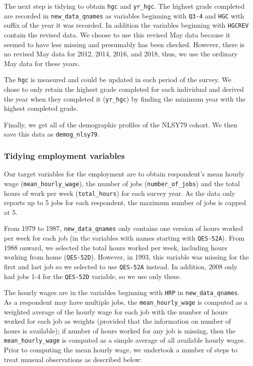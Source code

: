 \documentclass{article}
\begin{document}
The next step is tidying to obtain \texttt{hgc} and \texttt{yr\_hgc}. The highest grade completed are recorded in \texttt{new\_data\_qnames} as variables beginning with \texttt{Q3-4} and \texttt{HGC} with suffix of the year it was recorded. In addition the variables beginning with \texttt{HGCREV} contain the revised data. We choose to use this revised May data because it seemed to have less missing and presumably has been checked. However, there is no revised May data for 2012, 2014, 2016, and 2018, thus, we use the ordinary May data for these years.

The \texttt{hgc} is measured and could be updated in each period of the survey. We chose to only retain the highest grade completed for each individual and derived the year when they completed it (\texttt{yr\_hgc}) by finding the minimum year with the highest completed grade.

Finally, we get all of the demographic profiles of the NLSY79 cohort. We then save this data as \texttt{demog\_nlsy79}.

\hypertarget{tidyemp}{%
\subsubsection{Tidying employment variables}\label{tidyemp}}

Our target variables for the employment are to obtain respondent's mean hourly wage (\texttt{mean\_hourly\_wage}), the number of jobs (\texttt{number\_of\_jobs}) and the total hours of work per week (\texttt{total\_hours}) for each survey year. As the data only reports up to 5 jobs for each respondent, the maximum number of jobs is capped at 5.

From 1979 to 1987, \texttt{new\_data\_qnames} only contains one version of hours worked per week for each job (in the variables with names starting with \texttt{QES-52A}). From 1988 onward, we selected the total hours worked per week, including hours working from home (\texttt{QES-52D}). However, in 1993, this variable was missing for the first and last job so we selected to use \texttt{QES-52A} instead. In addition, 2008 only had jobs 1-4 for the \texttt{QES-52D} variable, so we use only these.

The hourly wages are in the variables beginning with \texttt{HRP} in \texttt{new\_data\_qnames}. As a respondent may have multiple jobs, the \texttt{mean\_hourly\_wage} is computed as a weighted average of the hourly wage for each job with the number of hours worked for each job as weights (provided that the information on number of hours is available); if number of hours worked for any job is missing, then the \texttt{mean\_hourly\_wage} is computed as a simple average of all available hourly wages. Prior to computing the mean hourly wage, we undertook a number of steps to treat unusual observations as described below:
\end{document}
